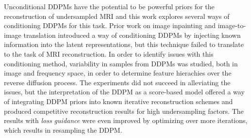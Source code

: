 %

\noindent Unconditional DDPMs have the potential to be powerful priors for the reconstruction of undersampled MRI and this work explores several ways of conditioning DDPMs for this task. Prior work on image inpainting and image-to-image translation introduced a way of conditioning DDPMs by injecting known information into the latent representations, but this technique failed to translate to the task of MRI reconstruction. In order to identify issues with this conditioning method, variability in samples from DDPMs was studied, both in image and frequency space, in order to determine feature hierachies over the reverse diffusion process. The experiments did not succeed in alleviating the issues, but the interpretation of the DDPM as a score-based model offered a way of integrating DDPM priors into known iterative reconstruction schemes and produced competitive reconstruction results for high undersampling factors. The results with \textit{loss guidance} were even improved by optimizing over more iterations, which results in resampling the DDPM.